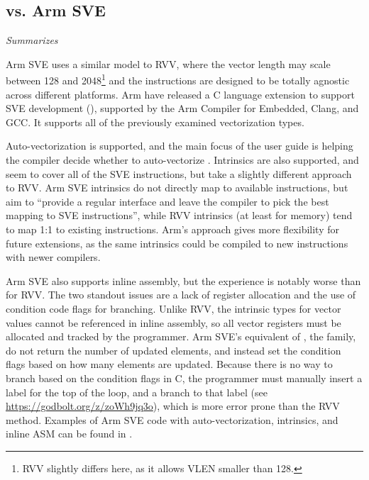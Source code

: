 \subsection{vs. Arm SVE}\label{chap:soft:compiling:armsve}
\emph{Summarizes }

Arm SVE uses a similar model to RVV, where the vector length may scale between 128 and 2048\footnote{RVV slightly differs here, as it allows VLEN smaller than 128.} and the instructions are designed to be totally agnostic across different platforms.
Arm have released a C language extension to support SVE development (), supported by the Arm Compiler for Embedded, Clang, and GCC.
It supports all of the previously examined vectorization types.

Auto-vectorization is supported, and the main focus of the user guide is helping the compiler decide whether to auto-vectorize .
Intrinsics are also supported, and seem to cover all of the SVE instructions, but take a slightly different approach to RVV.
Arm SVE intrinsics do not directly map to available instructions, but aim to \enquote{provide a regular interface and leave the compiler to pick the best mapping to SVE instructions}, while RVV intrinsics (at least for memory) tend to map 1:1 to existing instructions.
Arm's approach gives more flexibility for future extensions, as the same intrinsics could be compiled to new instructions with newer compilers.

Arm SVE also supports inline assembly, but the experience is notably worse than for RVV.
The two standout issues are a lack of register allocation and the use of condition code flags for branching.
Unlike RVV, the intrinsic types for vector values cannot be referenced in inline assembly, so all vector registers must be allocated and tracked by the programmer.
Arm SVE's equivalent of , the  family, do not return the number of updated elements, and instead set the condition flags based on how many elements are updated.
Because there is no way to branch based on the condition flags in C, the programmer must manually insert a label for the top of the loop, and a branch to that label (see \url{https://godbolt.org/z/zoWh9jq3o}), which is more error prone than the RVV method.
Examples of Arm SVE code with auto-vectorization, intrinsics, and inline ASM can be found in .


